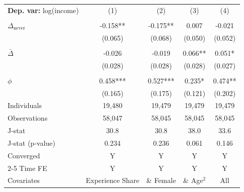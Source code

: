 \begin{tabular}{l cccc} \toprule  \textbf{Dep. var:}  log(income) 
                    &\multicolumn{1}{c}{(1)}   &\multicolumn{1}{c}{(2)}   &\multicolumn{1}{c}{(3)}   &\multicolumn{1}{c}{(4)}   \\
                    &               &               &               &               \\
\addlinespace
$\Delta_{\text{never}}$&      -0.158** &      -0.175** &       0.007   &      -0.021   \\
                    &     (0.065)   &     (0.068)   &     (0.050)   &     (0.052)   \\
                    &               &               &               &               \\
\addlinespace
$\bar{\Delta}$      &      -0.026   &      -0.019   &       0.066** &       0.051*  \\
                    &     (0.028)   &     (0.028)   &     (0.028)   &     (0.027)   \\
                    &               &               &               &               \\
\addlinespace
$\phi$              &       0.458***&       0.527***&       0.235*  &       0.474** \\
                    &     (0.165)   &     (0.175)   &     (0.121)   &     (0.202)   \\
\addlinespace
Individuals         &      19,480   &      19,479   &      19,479   &      19,479   \\
Observations        &      58,047   &      58,045   &      58,045   &      58,045   \\
J-stat              &        30.8   &        30.8   &        38.0   &        33.6   \\
J-stat (p-value)    &       0.234   &       0.236   &       0.061   &       0.146   \\
Converged           &           Y   &           Y   &           Y   &           Y   \\
\cmidrule{2-5} Time FE & Y & Y & Y & Y \\ Covariates & Experience Share & \& Female & \& Age$^2$ & All \\ \bottomrule \end{tabular}
